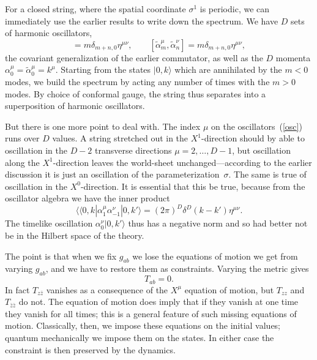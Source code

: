
For a closed string, where the spatial coordinate $\sigma^1$
is periodic,
we can immediately use the earlier results to write down the
spectrum.  We have $D$ sets of harmonic oscillators,
\begin{equation}
[\alpha^\mu_m, \alpha^\nu_n] = m \delta_{m+n,0} \eta^{\mu\nu} ,
\qquad
[\tilde\alpha^\mu_m, \tilde\alpha^\nu_n] = m \delta_{m+n,0}
\eta^{\mu\nu} , \label{osc}
\end{equation}
the covariant generalization of the earlier commutator, as well as
the $D$ momenta $\alpha^\mu_0 = \tilde \alpha^\mu_0 = k^\mu$.
Starting from the states $|0,k\rangle$ which are annihilated by
the $m < 0$ modes, we build the spectrum by acting any number of
times with the $m > 0$ modes.  By choice of conformal gauge, the
string thus separates into a superposition of harmonic oscillators.

But there is one more point to deal with.  The index $\mu$ on the
oscillators~(\ref{osc}) runs over $D$ values.  A
string stretched out in the
$X^1$-direction should by able to oscillation in the
$D-2$ transverse directions $\mu = 2, \ldots, D-1$, but
oscillation along the $X^1$-direction leaves the world-sheet
unchanged---according to the earlier discussion it is just an
oscillation of the parameterization~$\sigma$.  The same is true
of oscillation in the $X^0$-direction.  It is essential that this
be true, because from the oscillator algebra we have the inner
product
\begin{equation}
\langle\!\langle 0,k|\alpha^\mu_1 \alpha^\nu_{-1}|0,k'\rangle
= (2\pi)^D \delta^D (k-k') \eta^{\mu\nu}.
\end{equation}
The timelike oscillation $\alpha^\nu_{0}|0,k'\rangle$ thus has a
negative norm and so had better not be in the Hilbert space of the
theory.

The point is that when we fix $g_{ab}$ we lose the equations of
motion we get from varying $g_{ab}$, and we have to restore them
as constraints.  Varying the metric gives
\begin{equation}
T_{ab} = 0.  \label{tcon}
\end{equation}
In fact $T_{z\bar z}$ vanishes as a consequence of the
$X^\mu$ equation of motion, but $T_{zz}$ and $T_{\bar z \bar z}$ do
not.  The equation of motion does imply that if they vanish at one
time they vanish for all times; this is a general feature of such
missing equations of motion.  Classically, then, we impose these
equations on
the initial values; quantum mechanically we impose them on the
states.  In either case the constraint is then preserved by the
dynamics.

